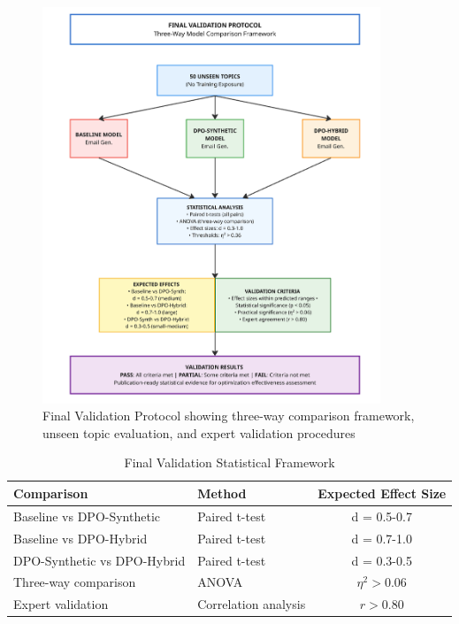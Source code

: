 \begin{figure}[H]
    \centering
    \includegraphics[width=0.9\textwidth]{figures/final_val.png}
    \caption[Final Validation Protocol]{Final Validation Protocol showing three-way comparison framework, unseen topic evaluation, and expert validation procedures}
    \label{fig:final-validation-protocol}
\end{figure}

\begin{table}[H]
    \centering
    \caption[Final Validation Statistical Framework]{Final Validation Statistical Framework}
    \label{tab:final-validation-framework}
    \begin{tabular}{|l|l|c|}
    \hline
    \textbf{Comparison} & \textbf{Method} & \textbf{Expected Effect Size} \\
    \hline
    Baseline vs DPO-Synthetic & Paired t-test & d = 0.5-0.7 \\
    Baseline vs DPO-Hybrid & Paired t-test & d = 0.7-1.0 \\
    DPO-Synthetic vs DPO-Hybrid & Paired t-test & d = 0.3-0.5 \\
    Three-way comparison & ANOVA & $\eta^2 > 0.06$  \\
    Expert validation & Correlation analysis & $r > 0.80$ \\
    \hline
    \end{tabular}
\end{table}

